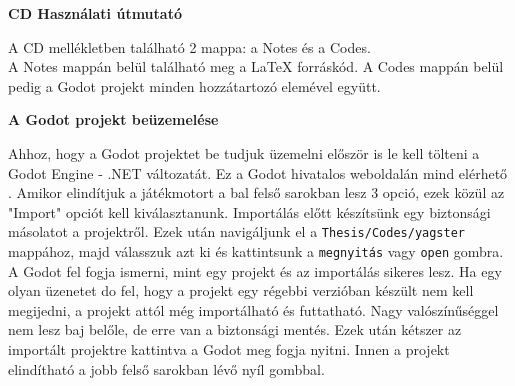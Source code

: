 \pagestyle{empty}
\label{cover:UseCase}

\noindent \textbf{\Large CD Használati útmutató}

\vskip 1cm

A CD mellékletben található 2 mappa: a Notes és a Codes.\\
A Notes mappán belül található meg a LaTeX forráskód. A Codes mappán belül pedig a Godot projekt minden hozzátartozó elemével együtt.

\vskip 1cm

\noindent \textbf{\Large A Godot projekt beüzemelése}

\vskip 1cm

Ahhoz, hogy a Godot projektet be tudjuk üzemelni először is le kell tölteni a Godot Engine - .NET változatát. Ez a Godot hivatalos weboldalán mind elérhető \cite{Godot}. Amikor elindítjuk a játékmotort a bal felső sarokban lesz 3 opció, ezek közül az "Import" opciót kell kiválasztanunk. Importálás előtt készítsünk egy biztonsági másolatot a projektről. Ezek után navigáljunk el a \texttt{Thesis/Codes/yagster} mappához, majd válasszuk azt ki és kattintsunk a \texttt{megnyitás} vagy \texttt{open} gombra. A Godot fel fogja ismerni, mint egy projekt és az importálás sikeres lesz. Ha egy olyan üzenetet do fel, hogy a projekt egy régebbi verzióban készült nem kell megijedni, a projekt attól még importálható és futtatható. Nagy valószínűséggel nem lesz baj belőle, de erre van a biztonsági mentés. Ezek után kétszer az importált projektre kattintva a Godot meg fogja nyitni. Innen a projekt elindítható a jobb felső sarokban lévő nyíl gombbal.